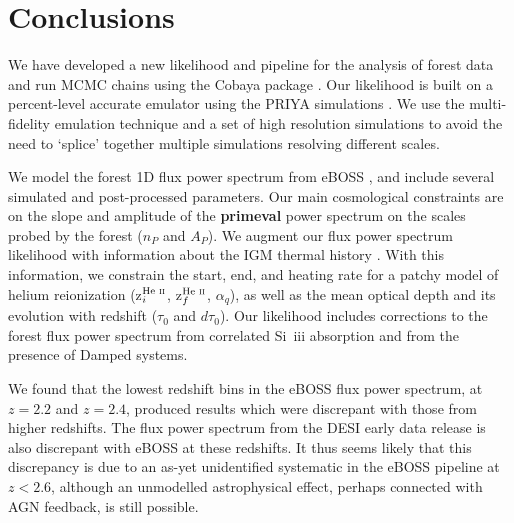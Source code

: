 \section{Conclusions}\label{sec:conclusions}

We have developed a new likelihood and pipeline for the analysis of \Lya forest data and run MCMC chains using the Cobaya package \cite{2021JCAP...05..057T, 2019ascl.soft10019T}.
Our likelihood is built on a percent-level accurate emulator using the PRIYA simulations \cite{2023simsuite}.
We use the multi-fidelity emulation technique \cite{2022MNRAS.517.3200F} and a set of high resolution simulations to avoid the need to `splice' together multiple simulations resolving different scales.

We model the \Lya forest 1D flux power spectrum from eBOSS \cite{2019JCAP...07..017C}, and include several simulated and post-processed parameters.
Our main cosmological constraints are on the slope and amplitude of the \textbf{primeval} power spectrum on the scales probed by the \Lya forest ($n_P$ and $A_P$). 
We augment our \Lya flux power spectrum likelihood with information about the IGM thermal history \cite{2021MNRAS.506.4389G}.
With this information, we constrain the start, end, and heating rate for a patchy model of helium reionization (z$^{\text{He~{\sc ii}}}_i$, z$^{\text{He~{\sc ii}}}_f$, $\alpha_q$), as well as the mean optical depth and its evolution with redshift ($\tau_0$ and $d\tau_0$).
Our likelihood includes corrections to the \lya forest flux power spectrum from correlated Si~{\sc iii} absorption and from the presence of Damped \lya systems.

We found that the lowest redshift bins in the eBOSS flux power spectrum, at $z=2.2$ and $z=2.4$, produced results which were discrepant with those from higher redshifts.
The flux power spectrum from the DESI early data release is also discrepant with eBOSS at these redshifts.
It thus seems likely that this discrepancy is due to an as-yet unidentified systematic in the eBOSS pipeline at $z < 2.6$, although an unmodelled astrophysical effect, perhaps connected with AGN feedback, is still possible.  


